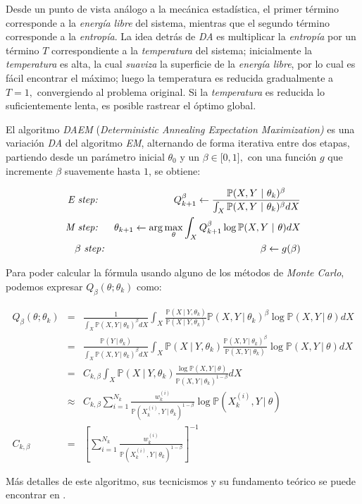 Desde un punto de vista análogo a la mecánica estadística, el primer término corresponde a la \emph{energía libre} del sistema, mientras que el segundo término corresponde a la \emph{entropía}. La idea detrás de \emph{DA} es multiplicar la \emph{entropía} por un término $T$ correspondiente a la \emph{temperatura} del sistema; inicialmente la \emph{temperatura} es alta, la cual \emph{suaviza} la superficie de la \emph{energía libre}, por lo cual es fácil encontrar el máximo; luego la temperatura es reducida gradualmente a $T=1,$ convergiendo al problema original. Si la \emph{temperatura} es reducida lo suficientemente lenta, es posible rastrear el óptimo global.

El algoritmo \emph{DAEM} (\emph{Deterministic Annealing Expectation Maximization)} es una variación \emph{DA} del algoritmo \emph{EM}, alternando de forma iterativa entre dos etapas, partiendo desde un parámetro inicial $\theta _{0}$ y un $\beta \in \lbrack 0,1],$ con una función $g$ que incremente $\beta $ suavemente hasta $1$, se obtiene:

\begin{eqnarray*}
	\emph{E\ step}\emph{:\ } &&Q_{k+1}^{\beta }\leftarrow \frac{\mathbb{P}(X,Y\
		|\ \theta _{k})^{\beta }}{\int_{X}\mathbb{P}(X,Y\ |\ \theta _{k})^{\beta }dX}
	\\
	\emph{M\ step}\emph{:\ } &&\theta _{k+1}\leftarrow \arg \max\limits_{\theta
	}\int_{X}Q_{k+1}^{\beta }\log \mathbb{P}(X,Y\ |\ \theta )dX \\
	\text{{}}\beta \ \text{\emph{step}} &\emph{:}&\text{\ }\beta \leftarrow
	g(\beta )
\end{eqnarray*}

Para poder calcular la fórmula usando alguno de los métodos de \emph{Monte Carlo}, podemos expresar $Q_{\beta}(\theta ;\theta _{k})$ como:

\begin{eqnarray*}
	Q_{\beta }(\theta ;\theta _{k}) &=&\frac{1}{\int_{X}\mathbb{P}(X,Y\ |\
		\theta _{k})^{\beta }dX}\int_{X}\frac{\mathbb{P}(X\ |\ Y,\theta _{k})}{
		\mathbb{P}(X\ |\ Y,\theta _{k})}\mathbb{P}(X,Y\ |\ \theta _{k})^{\beta }\log 
	\mathbb{P}(X,Y\ |\ \theta )dX \\
	&=&\frac{\mathbb{P}(Y\ |\ \theta _{k})}{\int_{X}\mathbb{P}(X,Y\ |\ \theta
		_{k})^{\beta }dX}\int_{X}\mathbb{P}(X\ |\ Y,\theta _{k})\frac{\mathbb{P}
		(X,Y\ |\ \theta _{k})^{\beta }}{\mathbb{P}(X,Y\ |\ \theta _{k})}\log \mathbb{
		P}(X,Y\ |\ \theta )dX \\
	&=&C_{k,\beta }\int_{X}\mathbb{P}(X\ |\ Y,\theta _{k})\frac{\log \mathbb{P}
		(X,Y\ |\ \theta )}{\mathbb{P}(X,Y\ |\ \theta _{k})^{1-\beta }}dX \\
	&\approx &C_{k,\beta }\sum_{i=1}^{N_{k}}\frac{w_{k}^{(i)}}{\mathbb{P}
		(X_{k}^{(i)},Y\ |\ \theta _{k})^{1-\beta }}\log \mathbb{P}(X_{k}^{(i)},Y\ |\
	\theta ) \\
	C_{k,\beta } &=&\left[ \sum_{i=1}^{N_{k}}\frac{w_{k}^{(i)}}{\mathbb{P}
		(X_{k}^{(i)},Y\ |\ \theta _{k})^{1-\beta }}\right] ^{-1}
\end{eqnarray*}

Más detalles de este algoritmo, sus tecnicismos y su fundamento teórico se puede encontrar en \cite{DBN-DAEM}.

